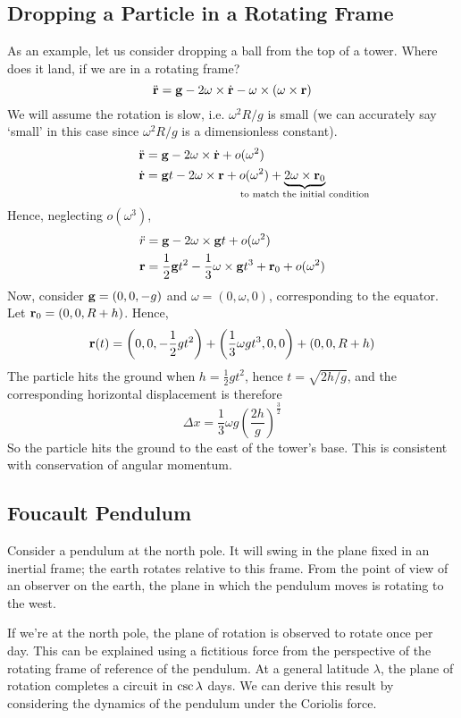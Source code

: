 \documentclass{article}
\begin{document}
\subsection{Dropping a Particle in a Rotating Frame}
As an example, let us consider dropping a ball from the top of a tower. Where does it land, if we are in a rotating frame?
\[ \ddot{\vb r} = \vb g - 2\vb\omega \times \dot{\vb r} - \vb\omega \times (\vb\omega \times \vb r) \]
We will assume the rotation is slow, i.e. $\omega^2 R / g$ is small (we can accurately say `small' in this case since $\omega^2R/g$ is a dimensionless constant).
\begin{align*}
	\rddot & = \vb g - 2\omega \times \rdot + o(\omega^2)                                                                                          \\
	\rdot  & = \vb gt - 2\omega \times \vb r + o(\omega^2) + \underbrace{2\omega\times \vb r_0}_{\mathclap{\text{to match the initial condition}}}
\end{align*}
Hence, neglecting $o(\omega^3)$,
\begin{align*}
	\ddot r & = \vb g - 2\omega \times \vb gt + o(\omega^2)                                       \\
	\vb r   & = \frac{1}{2}\vb gt^2 - \frac{1}{3}\vb\omega\times \vb gt^3 + \vb r_0 + o(\omega^2)
\end{align*}
Now, consider $\vb g = (0, 0, -g)$ and $\omega = (0, \omega, 0)$, corresponding to the equator. Let $\vb r_0 = (0, 0, R + h)$. Hence,
\[ \vb r(t) = \qty(0, 0, -\frac{1}{2}gt^2) + \qty(\frac{1}{3}\omega g t^3, 0, 0) + (0, 0, R + h) \]
The particle hits the ground when $h = \frac{1}{2}gt^2$, hence $t = \sqrt{2h/g}$, and the corresponding horizontal displacement is therefore
\[ \Delta x = \frac{1}{3}\omega g \left( \frac{2h}{g} \right)^{\frac{3}{2}} \]
So the particle hits the ground to the east of the tower's base. This is consistent with conservation of angular momentum.

\subsection{Foucault Pendulum}
Consider a pendulum at the north pole. It will swing in the plane fixed in an inertial frame; the earth rotates relative to this frame. From the point of view of an observer on the earth, the plane in which the pendulum moves is rotating to the west.

If we're at the north pole, the plane of rotation is observed to rotate once per day. This can be explained using a fictitious force from the perspective of the rotating frame of reference of the pendulum. At a general latitude $\lambda$, the plane of rotation completes a circuit in $\cosecant\lambda$ days. We can derive this result by considering the dynamics of the pendulum under the Coriolis force.
\end{document}
